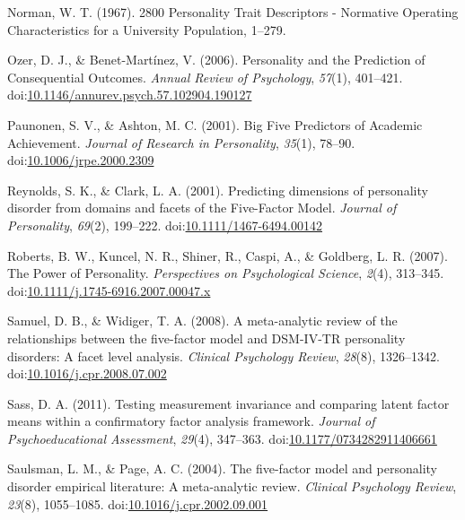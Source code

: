 \documentclass[,man,floatsintext]{apa6}
\theoremstyle{definition}
\theoremstyle{definition}
\theoremstyle{definition}
\theoremstyle{remark}
\begin{document}
\leavevmode\hypertarget{ref-Norman1967}{}%
Norman, W. T. (1967). 2800 Personality Trait Descriptors - Normative
Operating Characteristics for a University Population, 1--279.

\leavevmode\hypertarget{ref-OzerBenet2006}{}%
Ozer, D. J., \& Benet-Martínez, V. (2006). Personality and the
Prediction of Consequential Outcomes. \emph{Annual Review of
Psychology}, \emph{57}(1), 401--421.
doi:\href{https://doi.org/10.1146/annurev.psych.57.102904.190127}{10.1146/annurev.psych.57.102904.190127}

\leavevmode\hypertarget{ref-Paunonen2001}{}%
Paunonen, S. V., \& Ashton, M. C. (2001). Big Five Predictors of
Academic Achievement. \emph{Journal of Research in Personality},
\emph{35}(1), 78--90.
doi:\href{https://doi.org/10.1006/jrpe.2000.2309}{10.1006/jrpe.2000.2309}

\leavevmode\hypertarget{ref-ClarkReynolds2001}{}%
Reynolds, S. K., \& Clark, L. A. (2001). Predicting dimensions of
personality disorder from domains and facets of the Five-Factor Model.
\emph{Journal of Personality}, \emph{69}(2), 199--222.
doi:\href{https://doi.org/10.1111/1467-6494.00142}{10.1111/1467-6494.00142}

\leavevmode\hypertarget{ref-Roberts2007a}{}%
Roberts, B. W., Kuncel, N. R., Shiner, R., Caspi, A., \& Goldberg, L. R.
(2007). The Power of Personality. \emph{Perspectives on Psychological
Science}, \emph{2}(4), 313--345.
doi:\href{https://doi.org/10.1111/j.1745-6916.2007.00047.x}{10.1111/j.1745-6916.2007.00047.x}

\leavevmode\hypertarget{ref-SamuelWidiger2008}{}%
Samuel, D. B., \& Widiger, T. A. (2008). A meta-analytic review of the
relationships between the five-factor model and DSM-IV-TR personality
disorders: A facet level analysis. \emph{Clinical Psychology Review},
\emph{28}(8), 1326--1342.
doi:\href{https://doi.org/10.1016/j.cpr.2008.07.002}{10.1016/j.cpr.2008.07.002}

\leavevmode\hypertarget{ref-Sass2011}{}%
Sass, D. A. (2011). Testing measurement invariance and comparing latent
factor means within a confirmatory factor analysis framework.
\emph{Journal of Psychoeducational Assessment}, \emph{29}(4), 347--363.
doi:\href{https://doi.org/10.1177/0734282911406661}{10.1177/0734282911406661}

\leavevmode\hypertarget{ref-SaulsmanPage2004}{}%
Saulsman, L. M., \& Page, A. C. (2004). The five-factor model and
personality disorder empirical literature: A meta-analytic review.
\emph{Clinical Psychology Review}, \emph{23}(8), 1055--1085.
doi:\href{https://doi.org/10.1016/j.cpr.2002.09.001}{10.1016/j.cpr.2002.09.001}
\end{document}
